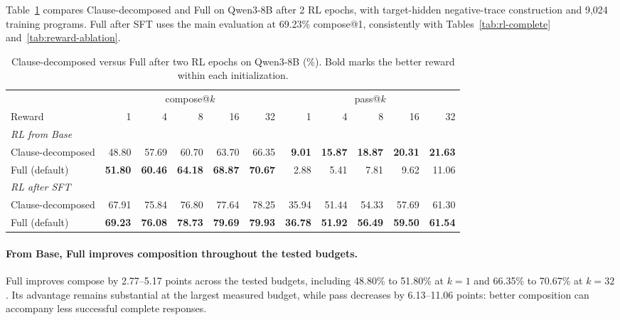 Table~\ref{tab:full-credit-comparison} compares Clause-decomposed and Full on
Qwen3-8B after 2 RL epochs, with target-hidden negative-trace construction and 9,024
training programs. Full after SFT uses the main evaluation at 69.23\%
compose@1, consistently with Tables~\ref{tab:rl-complete}
and~\ref{tab:reward-ablation}.

\begin{table}[H]
\centering
\small
\caption{Clause-decomposed versus Full after two RL epochs on Qwen3-8B (\%). Bold marks the better reward within each initialization.}
\label{tab:full-credit-comparison}
\begin{tabular}{lrrrrrrrrrr}
\toprule
\rowcolor{algobg}
& \multicolumn{5}{c}{compose@\(k\)} & \multicolumn{5}{c}{pass@\(k\)} \\
\headercmidrules{\cmidrule(lr){2-6}\cmidrule(lr){7-11}}
\rowcolor{algobg}
Reward & 1 & 4 & 8 & 16 & 32& 1 & 4 & 8 & 16 & 32 \\
\midrule
\multicolumn{11}{l}{\textit{RL from Base}} \\
Clause-decomposed & 48.80 & 57.69 & 60.70 & 63.70 & 66.35& \textbf{9.01} & \textbf{15.87} & \textbf{18.87} & \textbf{20.31} & \textbf{21.63} \\
Full (default) & \textbf{51.80} & \textbf{60.46} & \textbf{64.18} & \textbf{68.87} & \textbf{70.67}& 2.88 & 5.41 & 7.81 & 9.62 & 11.06 \\
\midrule
\multicolumn{11}{l}{\textit{RL after SFT}} \\
Clause-decomposed & 67.91 & 75.84 & 76.80 & 77.64 & 78.25& 35.94 & 51.44 & 54.33 & 57.69 & 61.30 \\
Full (default) & \textbf{69.23} & \textbf{76.08} & \textbf{78.73} & \textbf{79.69} & \textbf{79.93}& \textbf{36.78} & \textbf{51.92} & \textbf{56.49} & \textbf{59.50} & \textbf{61.54} \\
\bottomrule
\end{tabular}
\end{table}

\paragraph{From Base, Full improves composition throughout the tested budgets.}
Full improves compose by 2.77--5.17 points across the tested budgets,
including 48.80\% to 51.80\% at \(k=1\) and 66.35\% to 70.67\% at
\(k=32\).  Its advantage remains substantial at the largest measured
budget, while pass decreases by 6.13--11.06 points: better composition
can accompany less successful complete responses.

